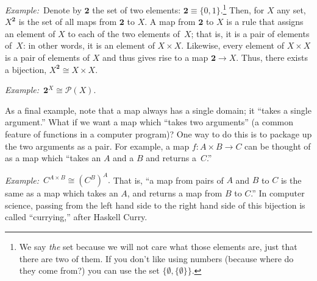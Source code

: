\documentclass[12pt, a4paper]{article}
\newcommand{\set}[1]{\mathbold{#1}}
\newcommand{\eg}{\emph{Example:}\relax}
\begin{document}
\eg\ Denote by $\set{2}$ the set of two elements:
$\set{2}\equiv\{0,1\}$.\footnote{We say \emph{the} set because we will not
care what those elements are, just that there are two of them. If you
don't like using numbers (because where do they come from?) you can
use the set $\{\emptyset, \{\emptyset\}\}$.} Then, for $X$ any set, $X^\set{2}$ is the
set of all maps from $\set{2}$ to $X$. A map from $\set{2}$ to $X$ is
a rule that assigns an element of $X$ to each of the two elements
of~$X$; that is, it is a pair of elements of~$X$: in other words,
it is an element of $X\times X$. Likewise, every element of $X\times X$ is a
pair of elements of $X$ and thus gives rise to a map $\set{2}\to
X$. Thus, there exists a bijection, $X^\set{2} \cong X\times X$.

\eg\ $\set{2}^X \cong \mathcal{P}(X)$. 

As a final example, note that a map always has a single domain;
it “takes a single argument.” What if we want a map which “takes two
arguments” (a common feature of functions in a computer program)? One
way to do this is to package up the two arguments as a pair. For
example, a map $f:A\times B\to C$ can be thought of as a map which “takes an
$A$ and a $B$ and returns a~$C$.”

\eg\ $C^{A\times B} \cong (C^B)^A.$ That is, “a map from pairs of $A$ and $B$ to
$C$ is the same as a map which takes an $A$, and returns a map from
$B$ to $C$.” In computer science, passing from the left hand side to
the right hand side of this bijection is called “currying,” after
Haskell Curry.
\end{document}
